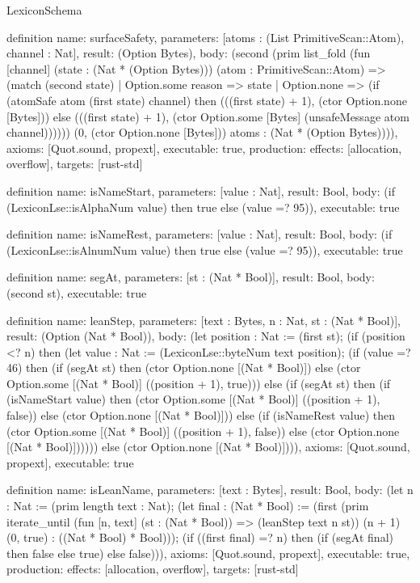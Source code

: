 \begin{lexlean}{LexiconSchema}
\begin{semanticmodule}
definition{
  name: surfaceSafety,
  parameters: [atoms : (List PrimitiveScan::Atom), channel : Nat],
  result: (Option Bytes),
  body: (second (prim list_fold (fun [channel] (state : (Nat * (Option Bytes))) (atom : PrimitiveScan::Atom) => (match (second state)
    | Option.some reason => state
    | Option.none => (if (atomSafe atom (first state) channel) then (((first state) + 1), (ctor Option.none [Bytes])) else (((first state) + 1), (ctor Option.some [Bytes] (unsafeMessage atom channel)))))) (0, (ctor Option.none [Bytes])) atoms : (Nat * (Option Bytes)))),
  axioms: [Quot.sound, propext],
  executable: true,
  production: {effects: [allocation, overflow], targets: [rust-std]}
}

definition{
  name: isNameStart,
  parameters: [value : Nat],
  result: Bool,
  body: (if (LexiconLse::isAlphaNum value) then true else (value =? 95)),
  executable: true
}

definition{
  name: isNameRest,
  parameters: [value : Nat],
  result: Bool,
  body: (if (LexiconLse::isAlnumNum value) then true else (value =? 95)),
  executable: true
}

definition{
  name: segAt,
  parameters: [st : (Nat * Bool)],
  result: Bool,
  body: (second st),
  executable: true
}

definition{
  name: leanStep,
  parameters: [text : Bytes, n : Nat, st : (Nat * Bool)],
  result: (Option (Nat * Bool)),
  body: (let position : Nat := (first st); (if (position <? n) then (let value : Nat := (LexiconLse::byteNum text position); (if (value =? 46) then (if (segAt st) then (ctor Option.none [(Nat * Bool)]) else (ctor Option.some [(Nat * Bool)] ((position + 1), true))) else (if (segAt st) then (if (isNameStart value) then (ctor Option.some [(Nat * Bool)] ((position + 1), false)) else (ctor Option.none [(Nat * Bool)])) else (if (isNameRest value) then (ctor Option.some [(Nat * Bool)] ((position + 1), false)) else (ctor Option.none [(Nat * Bool)]))))) else (ctor Option.none [(Nat * Bool)]))),
  axioms: [Quot.sound, propext],
  executable: true
}

definition{
  name: isLeanName,
  parameters: [text : Bytes],
  result: Bool,
  body: (let n : Nat := (prim length text : Nat); (let final : (Nat * Bool) := (first (prim iterate_until (fun [n, text] (st : (Nat * Bool)) => (leanStep text n st)) (n + 1) (0, true) : ((Nat * Bool) * Bool))); (if ((first final) =? n) then (if (segAt final) then false else true) else false))),
  axioms: [Quot.sound, propext],
  executable: true,
  production: {effects: [allocation, overflow], targets: [rust-std]}
}


\end{semanticmodule}
\end{lexlean}
